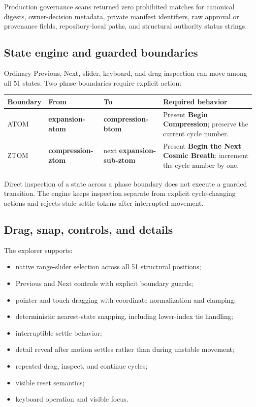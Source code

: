 \documentclass[11pt,letterpaper]{article}
\newcommand{\term}[1]{\textbf{\textsf{#1}}}
\begin{document}
\begin{checkpointbox}
Production governance scans returned zero prohibited matches for canonical
digests, owner-decision metadata, private manifest identifiers, raw approval or
provenance fields, repository-local paths, and structural authority status
strings.
\end{checkpointbox}

\subsection{State engine and guarded boundaries}

Ordinary Previous, Next, slider, keyboard, and drag inspection can move among
all 51 states. Two phase boundaries require explicit action:

\begin{longtable}{L{1.10in}L{1.40in}L{1.50in}L{1.90in}}
\toprule
\textbf{Boundary} & \textbf{From} & \textbf{To} & \textbf{Required behavior} \\
\midrule
ATOM & \term{expansion-atom} & \term{compression-btom} & Present \term{Begin Compression}; preserve the current cycle number. \\
ZTOM & \term{compression-ztom} & next \term{expansion-sub-ztom} & Present \term{Begin the Next Cosmic Breath}; increment the cycle number by one. \\
\bottomrule
\end{longtable}

Direct inspection of a state across a phase boundary does not execute a guarded
transition. The engine keeps inspection separate from explicit cycle-changing
actions and rejects stale settle tokens after interrupted movement.

\subsection{Drag, snap, controls, and details}

The explorer supports:

\begin{itemize}
    \item native range-slider selection across all 51 structural positions;
    \item Previous and Next controls with explicit boundary guards;
    \item pointer and touch dragging with coordinate normalization and clamping;
    \item deterministic nearest-state snapping, including lower-index tie handling;
    \item interruptible settle behavior;
    \item detail reveal after motion settles rather than during unstable movement;
    \item repeated drag, inspect, and continue cycles;
    \item visible reset semantics;
    \item keyboard operation and visible focus.
\end{itemize}
\end{document}
